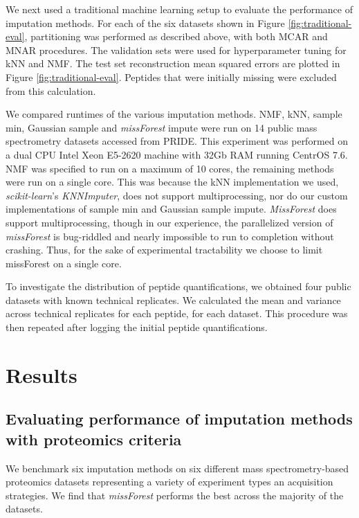 \documentclass{article}
\begin{document}
We next used a traditional machine learning setup to evaluate the performance of imputation methods. For each of the six datasets shown in Figure \ref{fig:traditional-eval}, partitioning was performed as described above, with both MCAR and MNAR procedures. The validation sets were used for hyperparameter tuning for kNN and NMF. The test set reconstruction mean squared errors are plotted in Figure \ref{fig:traditional-eval}. Peptides that were initially missing were excluded from this calculation. 

We compared runtimes of the various imputation methods. NMF, kNN, sample min, Gaussian sample and \textit{missForest} impute were run on 14 public mass spectrometry datasets accessed from PRIDE. This experiment was performed on a dual CPU Intel Xeon E5-2620 machine with 32Gb RAM running CentrOS 7.6. NMF was specified to run on a maximum of 10 cores, the remaining methods were run on a single core. This was because the kNN implementation we used, \textit{scikit-learn}'s \textit{KNNImputer}, does not support multiprocessing, nor do our custom implementations of sample min and Gaussian sample impute. \textit{MissForest} does support multiprocessing, though in our experience, the parallelized version of \textit{missForest} is bug-riddled and nearly impossible to run to completion without crashing. Thus, for the sake of experimental tractability we choose to limit missForest on a single core. 

To investigate the distribution of peptide quantifications, we obtained four public datasets with known technical replicates. We calculated the mean and variance across technical replicates for each peptide, for each dataset. This procedure was then repeated after logging the initial peptide quantifications. 

\section{Results}

\subsection{Evaluating performance of imputation methods with proteomics criteria}

We benchmark six imputation methods on six different mass spectrometry-based proteomics datasets representing a variety of experiment types an acquisition strategies. We find that \textit{missForest} \cite{missForest} performs the best across the majority of the datasets. 
\end{document}
